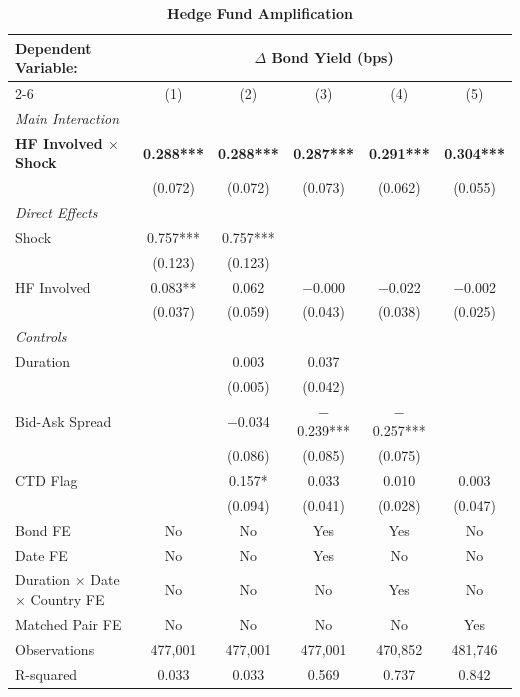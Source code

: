 \documentclass[english, 11pt, oneside]{article}
\begin{document}
\begin{table}[t]
\centering
\caption{\textbf{Hedge Fund Amplification}}
\footnotesize
\setlength{\tabcolsep}{9pt}
\renewcommand{\arraystretch}{1.1}
\begin{tabular}{l c c c c c}
\toprule
\textbf{Dependent Variable:} & \multicolumn{5}{c}{\textbf{$\Delta$ Bond Yield (bps)}} \\
\cmidrule(lr){2-6}
 & (1) & (2) & (3) & (4) & (5) \\
\midrule
\textit{Main Interaction} & & & & & \\
\textbf{HF Involved $\times$ Shock} & \textbf{0.288***} & \textbf{0.288***} & \textbf{0.287***} & \textbf{0.291***} & \textbf{0.304***} \\
 & (0.072) & (0.072) & (0.073) & (0.062) & (0.055) \\
\addlinespace
\textit{Direct Effects} & & & & & \\
Shock & 0.757*** & 0.757*** &  &  &  \\
 & (0.123) & (0.123) &  &  &  \\
HF Involved & 0.083** & 0.062 & $-$0.000 & $-$0.022 & $-$0.002 \\
 & (0.037) & (0.059) & (0.043) & (0.038) & (0.025) \\
\addlinespace
\textit{Controls} & & & & & \\
Duration & & 0.003 & 0.037 &  &  \\
 & & (0.005) & (0.042) &  &  \\
Bid-Ask Spread & & $-$0.034 & $-$0.239*** & $-$0.257*** &  \\
 & & (0.086) & (0.085) & (0.075) &  \\
CTD Flag & & 0.157* & 0.033 & 0.010 & 0.003 \\
 & & (0.094) & (0.041) & (0.028) & (0.047) \\
\midrule
Bond FE & No & No & Yes & Yes & No \\
Date FE & No & No & Yes & No & No \\
Duration $\times$ Date $\times$ Country FE & No & No & No & Yes & No \\
Matched Pair FE & No & No & No & No & Yes \\
\midrule
Observations & 477,001 & 477,001 & 477,001 & 470,852 & 481,746 \\
R-squared & 0.033 & 0.033 & 0.569 & 0.737 & 0.842 \\
\bottomrule
\end{tabular}
\label{tab:baseline}


\end{table}
\end{document}
